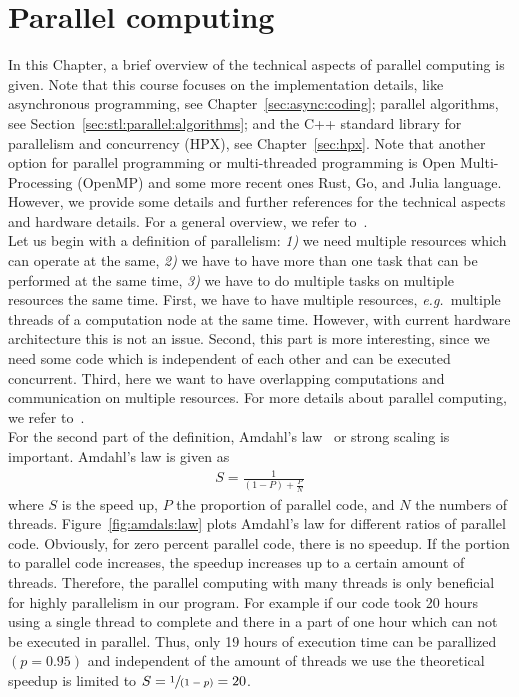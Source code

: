 \chapter{Parallel computing}
In this Chapter, a brief overview of the technical aspects of parallel computing is given. Note that this course focuses on the implementation details, like asynchronous programming, see Chapter~\ref{sec:async:coding}; parallel algorithms, see Section~\ref{sec:stl:parallel:algorithms}; and the C++ standard library for parallelism and concurrency (HPX), see Chapter~\ref{sec:hpx}. Note that another option for parallel programming or multi-threaded programming is Open Multi-Processing (OpenMP) and some more recent ones Rust, Go\link{}, and Julia language. However, we provide some details and further references for the technical aspects and hardware details. For a general overview, we refer to~\cite{kumar1994introduction}.\\

Let us begin with a definition of parallelism: \textit{1)} we need multiple resources which can operate at the same, \textit{2)} we have to have more than one task that can be performed at the same time, \textit{3)} we have to do multiple tasks on multiple resources the same time. First, we have to have multiple resources, \emph{e.g.}\ multiple threads of a computation node at the same time. However, with current hardware architecture this is not an issue. Second, this part is more interesting, since we need some code which is independent of each other and can be executed concurrent. Third, here we want to have overlapping computations and communication on multiple resources. For more details about parallel computing, we refer to~\cite{grama2003introduction,trobec2018introduction}.\\

For the second part of the definition, Amdahl's law~\cite{amdahl1967validity} or strong scaling is important. Amdahl's law is given as
\begin{align}
S = \frac{1}{(1-P) + \frac{P}{N}}
\end{align}
where $S$ is the speed up, $P$ the proportion of parallel code, and $N$ the numbers of threads. Figure~\ref{fig:amdals:law} plots Amdahl's law for different ratios of parallel code. Obviously, for zero percent parallel code, there is no speedup. If the portion to parallel code increases, the speedup increases up to a certain amount of threads. Therefore, the parallel computing with many threads is only beneficial for highly parallelism in our program. For example if our code took 20 hours using a single thread to complete and there in a part of one hour which can not be executed in parallel. Thus, only 19 hours of execution time can be parallized $(p=0.95)$ and independent of the amount of threads we use the theoretical speedup is limited to $S=\sfrac{1}{(1-p)}=20$.\\

